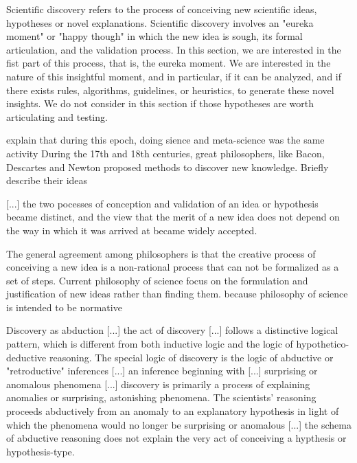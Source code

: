 Scientific discovery refers to the process of conceiving new scientific ideas, hypotheses or novel explanations. Scientific discovery involves an "eureka moment" or "happy though" in which the new idea is sough, its formal articulation, and the validation process. In this section, we are interested in the fist part of this process, that is, the eureka moment. We are interested in the nature of this insightful moment, and in particular, if it can be analyzed, and if there exists rules, algorithms, guidelines, or heuristics, to generate these novel insights. We do not consider in this section if those hypotheses are worth articulating and testing.

{\color{red} explain that during this epoch, doing sience and meta-science was the same activity} During the 17th and 18th centuries, great philosophers, like Bacon, Descartes and Newton proposed methods to discover new knowledge. {\color{red} Briefly describe their ideas}

{\color{red} [...] the two pocesses of conception and validation of an idea or hypothesis became distinct, and the view that the merit of a new idea does not depend on the way in which it was arrived at became widely accepted.} 

The general agreement among philosophers is that the creative process of conceiving a new idea is a non-rational process that can not be formalized as a set of steps. Current philosophy of science focus on the formulation and justification of new ideas rather than finding them. {\color{red} because philosophy of science is intended to be normative}

{\color{red} Discovery as abduction [...] the act of discovery [...] follows a distinctive logical pattern, which is different from both inductive logic and the logic of hypothetico-deductive reasoning. The special logic of discovery is the logic of abductive or "retroductive" inferences [...] an inference beginning with [...] surprising or anomalous phenomena [...] discovery is primarily a process of explaining anomalies or surprising, astonishing phenomena. The scientists' reasoning proceeds abductively from an anomaly to an explanatory hypothesis in light of which the phenomena would no longer be surprising or anomalous [...] the schema of abductive reasoning does not explain the very act of conceiving a hypthesis or hypothesis-type.}

